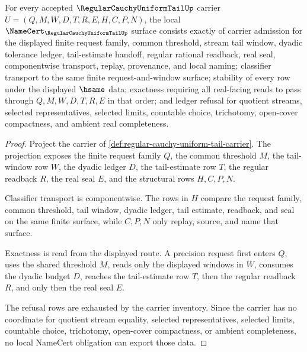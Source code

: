 \begin{theorem}
\label{thm:regular-cauchy-uniform-tail-namecert-obligations}
For every accepted $\RegularCauchyUniformTailUp$ carrier $U=(Q,M,W,D,T,R,E,H,C,P,N)$, the local $\NameCert_{\RegularCauchyUniformTailUp}$ surface consists exactly of carrier admission for the displayed finite request family, common threshold, stream tail window, dyadic tolerance ledger, tail-estimate handoff, regular rational readback, real seal, componentwise transport, replay, provenance, and local naming; classifier transport to the same finite request-and-window surface; stability of every row under the displayed $\hsame$ data; exactness requiring all real-facing reads to pass through $Q,M,W,D,T,R,E$ in that order; and ledger refusal for quotient streams, selected representatives, selected limits, countable choice, trichotomy, open-cover compactness, and ambient real completeness.
\end{theorem}
\begin{proof}
Project the carrier of \autoref{def:regular-cauchy-uniform-tail-carrier}. The projection exposes the finite request family $Q$, the common threshold $M$, the tail-window row $W$, the dyadic ledger $D$, the tail-estimate row $T$, the regular readback $R$, the real seal $E$, and the structural rows $H,C,P,N$.

Classifier transport is componentwise. The rows in $H$ compare the request family, common threshold, tail window, dyadic ledger, tail estimate, readback, and seal on the same finite surface, while $C,P,N$ only replay, source, and name that surface.

Exactness is read from the displayed route. A precision request first enters $Q$, uses the shared threshold $M$, reads only the displayed windows in $W$, consumes the dyadic budget $D$, reaches the tail-estimate row $T$, then the regular readback $R$, and only then the real seal $E$.

The refusal rows are exhausted by the carrier inventory. Since the carrier has no coordinate for quotient stream equality, selected representatives, selected limits, countable choice, trichotomy, open-cover compactness, or ambient completeness, no local NameCert obligation can export those data.
\end{proof}


